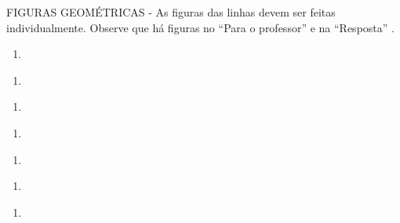 \documentclass[a4,12pt]{book}
\begin{document}
\begin{imagem*}[breakable]{}{}   FIGURAS GEOMÉTRICAS - As figuras das linhas devem ser feitas individualmente. Observe que há figuras no   ``Para o professor''   e na   ``Resposta''  .  
\end{imagem*}
\begin{enumerate} [\quad a)] %
  \item     
\end{enumerate} %
\begin{enumerate} [\quad a)] %
  \item     
\end{enumerate} %
\begin{enumerate} [\quad a)] %
  \item     
\end{enumerate} %
\begin{enumerate} [\quad a)] %
  \item     
\end{enumerate} %
\begin{enumerate} [\quad a)] %
  \item     
\end{enumerate} %
\begin{enumerate} [\quad a)] %
  \item     
\end{enumerate} %
\begin{enumerate} [\quad a)] %
  \item     
\end{enumerate} %
\end{document}
